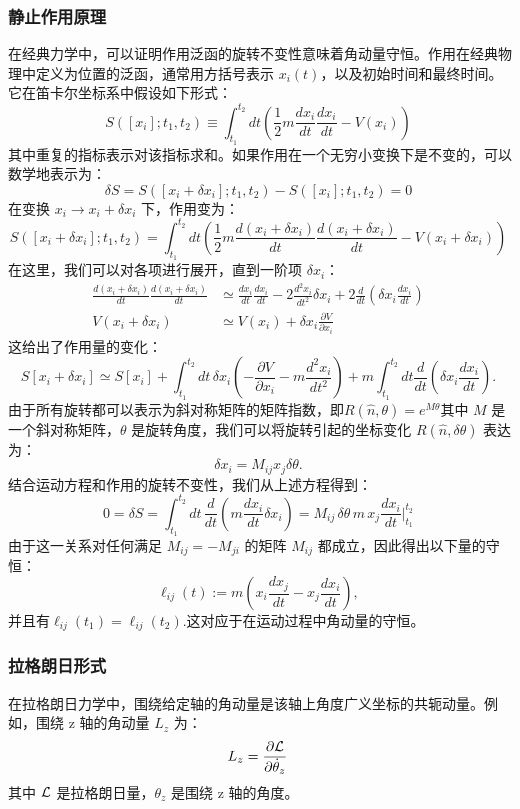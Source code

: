 \subsubsection{静止作用原理}
在经典力学中，可以证明作用泛函的旋转不变性意味着角动量守恒。作用在经典物理中定义为位置的泛函，通常用方括号表示 \( x_{i}(t) \)，以及初始时间和最终时间。它在笛卡尔坐标系中假设如下形式：
\[
S\left([x_{i}];t_{1},t_{2}\right) \equiv \int_{t_{1}}^{t_{2}} dt \left({\frac {1}{2}}m {\frac {dx_{i}}{dt}} {\frac {dx_{i}}{dt}} - V(x_{i})\right)~
\]
其中重复的指标表示对该指标求和。如果作用在一个无穷小变换下是不变的，可以数学地表示为：
\[
\delta S = S\left([x_{i}+\delta x_{i}];t_{1},t_{2}\right) - S\left([x_{i}];t_{1},t_{2}\right) = 0~
\]
在变换 \( x_{i} \rightarrow x_{i} + \delta x_{i} \) 下，作用变为：
\[
S\left([x_{i}+\delta x_{i}];t_{1},t_{2}\right) = \int_{t_{1}}^{t_{2}} dt \left({\frac {1}{2}}m {\frac {d(x_{i}+\delta x_{i})}{dt}} {\frac {d(x_{i}+\delta x_{i})}{dt}} - V(x_{i}+\delta x_{i})\right)~
\]
在这里，我们可以对各项进行展开，直到一阶项 \( \delta x_{i} \)：
\[
\begin{aligned}
\frac{d(x_{i}+\delta x_{i})}{dt}\frac{d(x_{i}+\delta x_{i})}{dt} & \simeq \frac{dx_{i}}{dt}\frac{dx_{i}}{dt} - 2\frac{d^{2}x_{i}}{dt^{2}}\delta x_{i} + 2\frac{d}{dt}\left(\delta x_{i}\frac{dx_{i}}{dt}\right) \\
V(x_{i}+\delta x_{i}) & \simeq V(x_{i}) + \delta x_{i}\frac{\partial V}{\partial x_{i}}
\end{aligned}~
\]
这给出了作用量的变化：
\[
S[x_{i}+\delta x_{i}] \simeq S[x_{i}] + \int_{t_{1}}^{t_{2}}dt\,\delta x_{i}\left(-\frac{\partial V}{\partial x_{i}} - m\frac{d^{2}x_{i}}{dt^{2}}\right) + m\int_{t_{1}}^{t_{2}}dt\frac{d}{dt}\left(\delta x_{i}\frac{dx_{i}}{dt}\right).~
\]
由于所有旋转都可以表示为斜对称矩阵的矩阵指数，即\(R({\hat {n}},\theta) = e^{M\theta}\)其中 \(M\) 是一个斜对称矩阵，\(\theta\) 是旋转角度，我们可以将旋转引起的坐标变化 \(R({\hat {n}},\delta \theta)\) 表达为：
\[
\delta x_{i} = M_{ij}x_{j}\delta \theta.~
\]
结合运动方程和作用的旋转不变性，我们从上述方程得到：
\[
0 = \delta S = \int_{t_{1}}^{t_{2}}dt\,\frac{d}{dt}\left(m\frac{dx_{i}}{dt}\delta x_{i}\right) = M_{ij}\,\delta \theta \,m\,x_{j}\frac{dx_{i}}{dt}\Bigg|_{t_{1}}^{t_{2}}~
\]
由于这一关系对任何满足 \(M_{ij} = -M_{ji}\) 的矩阵 \(M_{ij}\) 都成立，因此得出以下量的守恒：
\[
\ell_{ij}(t) := m\left(x_{i}\frac{dx_{j}}{dt} - x_{j}\frac{dx_{i}}{dt}\right),~
\]
并且有\(\ell_{ij}(t_{1}) = \ell_{ij}(t_{2})\).这对应于在运动过程中角动量的守恒。 
\subsubsection{拉格朗日形式}
在拉格朗日力学中，围绕给定轴的角动量是该轴上角度广义坐标的共轭动量。例如，围绕 z 轴的角动量 \(L_{z}\) 为：
\[
L_{z} = \frac{\partial {\cal L}}{\partial {\dot{\theta}}_{z}}~
\]
其中 \({\cal L}\) 是拉格朗日量，\(\theta_{z}\) 是围绕 z 轴的角度。

